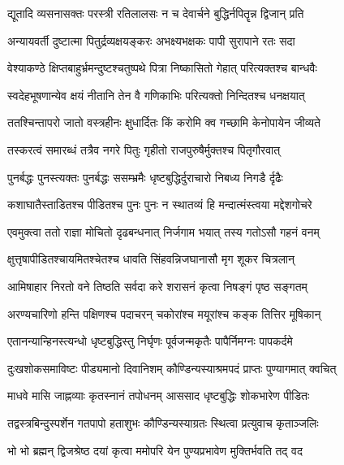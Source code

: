 \twolineshloka
{द्यूतादि व्यसनासक्तः परस्त्री रतिलालसः}
{न च देवार्चने बुद्धिर्नपितॄन्न द्विजान् प्रति}%

\twolineshloka
{अन्यायवर्ती दुष्टात्मा पितुर्द्रव्यक्षयङ्करः}
{अभक्ष्यभक्षकः पापी सुरापाने रतः सदा}%

\twolineshloka
{वेश्याकण्ठे क्षिप्तबाहुर्भ्रमन्दुष्टश्चतुष्पथे}
{पित्रा निष्कासितो गेहात् परित्यक्तश्च बान्धवैः}%

\twolineshloka
{स्वदेहभूषणान्येव क्षयं नीतानि तेन वै}
{गणिकाभिः परित्यक्तो निन्दितश्च धनक्षयात्}%

\twolineshloka
{ततश्चिन्तापरो जातो वस्त्रहीनः क्षुधार्दितः}
{किं करोमि क्व गच्छामि केनोपायेन जीव्यते}%

\twolineshloka
{तस्करत्वं समारब्धं तत्रैव नगरे पितुः}
{गृहीतो राजपुरुषैर्मुक्तश्च पितृगौरवात्}%

\twolineshloka
{पुनर्बद्धः पुनस्त्यक्तः पुनर्बद्धः ससम्भ्रमैः}
{धृष्टबुद्धिर्दुराचारो निबध्य निगडै र्दृढैः}%

\twolineshloka
{कशाघातैस्ताडितश्च पीडितश्च पुनः पुनः}
{न स्थातव्यं हि मन्दात्मंस्त्वया मद्देशगोचरे}%

\twolineshloka
{एवमुक्त्वा ततो राज्ञा मोचितो दृढबन्धनात्}
{निर्जगाम भयात् तस्य गतोऽसौ गहनं वनम्}%

\twolineshloka
{क्षुत्तृषापीडितश्चायमितश्चेतश्च धावति}
{सिंहवन्निजघानासौ मृग शूकर चित्रलान्}%

\twolineshloka
{आमिषाहार निरतो वने तिष्ठति सर्वदा}
{करे शरासनं कृत्वा निषङ्गं पृष्ठ सङ्गतम्}%

\twolineshloka
{अरण्यचारिणो हन्ति पक्षिणश्च पदाचरन्}
{चकोरांश्च मयूरांश्च कङ्क तित्तिर मूषिकान्}%

\twolineshloka
{एतानन्यान्हिनस्त्यन्धो धृष्टबुद्धिस्तु निर्घृणः}
{पूर्वजन्मकृतैः पापैर्निमग्नः पापकर्दमे}%

\twolineshloka
{दुःखशोकसमाविष्टः पीड्यमानो दिवानिशम्}
{कौण्डिन्यस्याश्रमपदं प्राप्तः पुण्यागमात् क्वचित्}%

\twolineshloka
{माधवे मासि जाह्नव्याः कृतस्नानं तपोधनम्}
{आससाद धृष्टबुद्धिः शोकभारेण पीडितः}%

\twolineshloka
{तद्वस्त्रबिन्दुस्पर्शेन गतपापो हताशुभः}
{कौण्डिन्यस्याग्रतः स्थित्वा प्रत्युवाच कृताञ्जलिः}%


\twolineshloka
{भो भो ब्रह्मन् द्विजश्रेष्ठ दयां कृत्वा ममोपरि}
{येन पुण्यप्रभावेण मुक्तिर्भवति तद् वद}%


